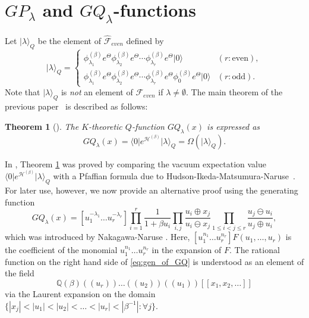 \documentclass{amsart}
\newtheorem{thm}{Theorem}[section]
\def\QQ{\mathord{\mathbb{Q}}}
\def\ket#1{\vert #1 \rangle}
\def\bra#1{\langle #1 \vert}
\begin{document}
\section{$GP_\lambda$ and $GQ_\lambda$-functions}\label{sec:main_part}


Let $\ket{\lambda}_Q$ be the element of $ \widehat{\mathcal{F}}_{even}$ defined by
\begin{equation}\label{eq:vector_Q}
\ket{\lambda}_Q=
\begin{cases}
\phi^{(\beta)}_{\lambda_1}e^{\Theta}\phi^{(\beta)}_{\lambda_2}e^{\Theta}\cdots
\phi^{(\beta)}_{\lambda_r}e^{\Theta}\ket{0} & (r:\mbox{even}),\\
\phi^{(\beta)}_{\lambda_1}e^{\Theta}\phi^{(\beta)}_{\lambda_2}e^{\Theta}\cdots
\phi^{(\beta)}_{\lambda_r}e^{\Theta}
\phi^{(\beta)}_{0}e^{\Theta}
\ket{0}  & (r:\mbox{odd}).
\end{cases}
\end{equation}
Note that $\ket{\lambda}_Q$ is \textit{not} an element of $\mathcal{F}_{even}$ if $\lambda\neq \emptyset$.
The main theorem of the previous paper~\cite{iwao2021neutralfermionic} is described as follows:
\begin{thm}[{\cite[\S 7]{iwao2021neutralfermionic}}]\label{thm:prev_main_theorem}
The $K$-theoretic $Q$-function $GQ_\lambda(x)$ is expressed as 
\begin{equation*}
GQ_\lambda(x)=\bra{0}e^{\mathcal{H}^{(\beta)}}\ket{\lambda}_Q
=\Omega(\ket{\lambda}_Q).
\end{equation*}
\end{thm}
In \cite{iwao2021neutralfermionic}, Theorem \ref{thm:prev_main_theorem} was proved by comparing the vacuum expectation value $\bra{0}e^{\mathcal{H}^{(\beta)}}\ket{\lambda}_Q$ with a Pfaffian formula due to Hudson-Ikeda-Matsumura-Naruse~\cite{HUDSON2017115}.
For later use, however, we now provide an alternative proof using the generating function 
\begin{equation}\label{eq:gen_of_GQ}
GQ_\lambda(x)=[u_1^{-\lambda_1}\dots u_{r}^{-\lambda_{r}}]
\prod_{i=1}^r
\frac{1}{1+\beta u_i}
\prod_{i,j}\frac{u_i\oplus x_j}{u_i\ominus x_j}
\prod_{1\leq i<j\leq r}\frac{u_j\ominus u_i}{u_j\oplus u_i},
\end{equation}
which was introduced by Nakagawa-Naruse \cite[\S 5.2]{nakagawa2018universalfactrial}.
Here, $[u_1^{n_1}\dots u_r^{n_r}]F(u_1,\dots,u_r)$ is the coefficient of the monomial $u_1^{n_1}\dots u_r^{n_r}$ in the expansion of $F$.
The rational function on the right hand side of \eqref{eq:gen_of_GQ} is understood as an element of the field
\[
\QQ(\beta)((u_r))\dots ((u_2))((u_1))[[x_1,x_2,\dots]]
\]
via the Laurent expansion on the domain $\{|x_j|<|u_1|<|u_2|<\dots<|u_r|<|\beta^{-1}|:\forall j\}$.
\end{document}
